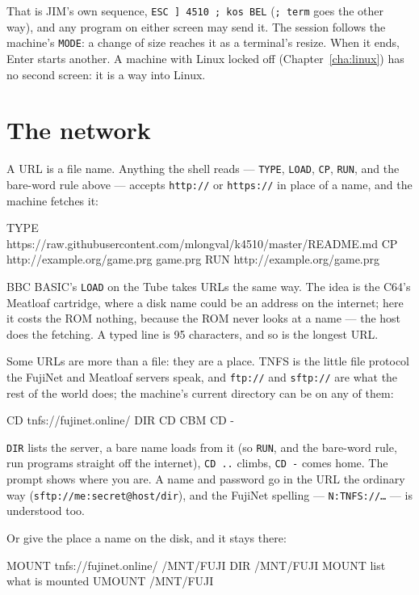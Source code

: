 \noindent That is JIM's own sequence, \verb|ESC ] 4510 ; kos BEL|
(\verb|; term| goes the other way), and any program on either screen may
send it. The session follows the machine's \verb|MODE|: a change of size
reaches it as a terminal's resize. When it ends, Enter starts another.
A machine with Linux locked off (Chapter~\ref{cha:linux}) has no second
screen: it is a way into Linux.

\section{The network}
A URL is a file name. Anything the shell reads --- \verb|TYPE|, \verb|LOAD|,
\verb|CP|, \verb|RUN|, and the bare-word rule above --- accepts
\texttt{http://} or \texttt{https://} in place of a name, and the machine
fetches it:

\begin{type}
TYPE https://raw.githubusercontent.com/mlongval/k4510/master/README.md
CP http://example.org/game.prg game.prg
RUN http://example.org/game.prg
\end{type}

BBC BASIC's \verb|LOAD| on the Tube takes URLs the same way. The idea is the C64's Meatloaf cartridge, where a disk name could
be an address on the internet; here it costs the ROM nothing, because the
ROM never looks at a name --- the host does the fetching. A typed line is 95
characters, and so is the longest URL.

Some URLs are more than a file: they are a place. TNFS is the little
file protocol the FujiNet and Meatloaf servers speak, and \texttt{ftp://}
and \texttt{sftp://} are what the rest of the world does; the machine's
current directory can be on any of them:

\begin{type}
CD tnfs://fujinet.online/
DIR
CD CBM
CD -
\end{type}

\verb|DIR| lists the server, a bare name loads from it (so \verb|RUN|, and
the bare-word rule, run programs straight off the internet), \verb|CD ..|
climbs, \verb|CD -| comes home. The prompt shows where you are. A name
and password go in the URL the ordinary way
(\texttt{sftp://me:secret@host/dir}), and the FujiNet spelling ---
\texttt{N:TNFS://\ldots} --- is understood too.

Or give the place a name on the disk, and it stays there:

\begin{type}
MOUNT tnfs://fujinet.online/ /MNT/FUJI
DIR /MNT/FUJI
MOUNT                     list what is mounted
UMOUNT /MNT/FUJI
\end{type}

